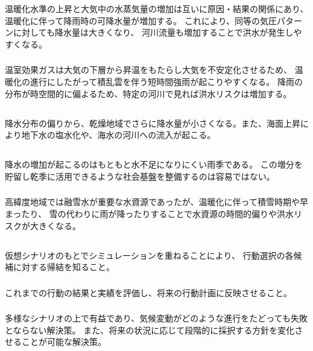 \documentclass[a4paper]{jsarticle}
\begin{document}
\section{}
\subsection{}
\subsubsection{}
温暖化水準の上昇と大気中の水蒸気量の増加は互いに原因・結果の関係にあり、
温暖化に伴って降雨時の可降水量が増加する。
これにより、同等の気圧パターンに対しても降水量は大きくなり、
河川流量も増加することで洪水が発生しやすくなる。

\subsubsection{}
温室効果ガスは大気の下層から昇温をもたらし大気を不安定化させるため、
温暖化の進行にしたがって積乱雲を伴う短時間強雨が起こりやすくなる。
降雨の分布が時空間的に偏よるため、特定の河川で見れば洪水リスクは増加する。

\subsection{}
降水分布の偏りから、乾燥地域でさらに降水量が小さくなる。また、海面上昇により地下水の塩水化や、海水の河川への流入が起こる。

\subsection{}
\subsubsection{}
降水の増加が起こるのはもともと水不足になりにくい雨季である。
この増分を貯留し乾季に活用できるような社会基盤を整備するのは容易ではない。

\subsubsection{}
高緯度地域では融雪水が重要な水資源であったが、温暖化に伴って積雪時期や早まったり、
雪の代わりに雨が降ったりすることで水資源の時間的偏りや洪水リスクが大きくなる。

\subsection{}
\subsubsection{}
仮想シナリオのもとでシミュレーションを重ねることにより、
行動選択の各候補に対する帰結を知ること。
\subsubsection{}
これまでの行動の結果と実績を評価し、将来の行動計画に反映させること。
\subsubsection{}
多様なシナリオの上で有益であり、気候変動がどのような進行をたどっても失敗とならない解決策。
また、将来の状況に応じて段階的に採択する方針を変化させることが可能な解決策。
\end{document}
